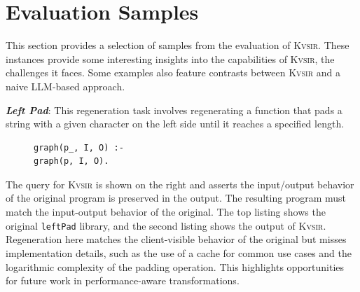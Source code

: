 \documentclass[sigplan,review,anonymous,10pt]{acmart}
\newcommand{\sys}{{\scshape Kv{\textalpha}sir}\xspace}
\newcommand{\heading}[1]{\vspace{2pt}\noindent\textbf{\emph{#1}}:\enspace}
\newcommand{\ttt}[1]{\texttt{#1}\xspace}
\begin{document}



\appendix

\section{Evaluation Samples}
\label{appendix:samples}
This section provides a selection of samples from the evaluation of \sys.
These instances provide some interesting insights into the capabilities of \sys, the challenges it faces.
Some examples also feature contrasts between \sys and a naive LLM-based approach.

\heading{Left Pad}
This regeneration task involves regenerating a
function that pads a string with a given character on the left side until it
reaches a specified length.

\begin{figure}
\begin{verbatim}
graph(p_, I, O) :-
graph(p, I, O).
\end{verbatim}
\end{figure}
The query for \sys is shown on the right and asserts the input/output behavior of the
original program is preserved in the output.
The resulting program must match the input-output behavior of the original.
The top listing shows the original \ttt{leftPad} library, and the second listing shows the output
of \sys.
Regeneration here matches the client-visible behavior of the original but misses
implementation details, such as the use of a cache for common
use cases and the logarithmic complexity of the padding operation.
This highlights opportunities for future work in performance-aware transformations.
\end{document}
